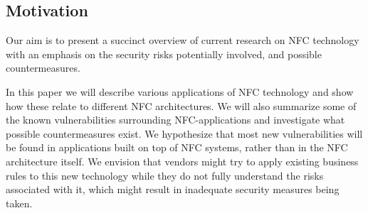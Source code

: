 
\subsection{Motivation}
Our aim is to present a succinct overview of current research on NFC technology with an emphasis on the security risks potentially involved, and possible countermeasures.



In this paper we will describe various applications of NFC technology and show how these relate to different NFC architectures.
We will also summarize some of the known vulnerabilities surrounding NFC-applications and investigate what possible countermeasures exist.
We hypothesize that most new vulnerabilities will be found in applications built on top of NFC systems, rather than in the NFC architecture itself.
We envision that vendors might try to apply existing business rules to this new technology while they do not fully understand the risks associated with it, which might result in inadequate security measures being taken.




